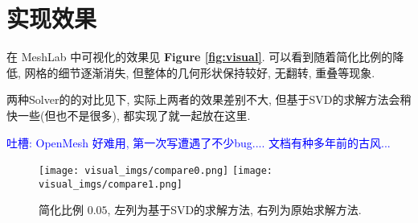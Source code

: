 \documentclass[11pt]{article}
\newcommand\1{\mathds{1}}
\begin{document}
\section{实现效果}
在 MeshLab 中可视化的效果见 \textbf{Figure \ref{fig:visual}}. 可以看到随着简化比例的降低,
网格的细节逐渐消失, 但整体的几何形状保持较好, 无翻转, 重叠等现象. 

两种Solver的的对比见下, 实际上两者的效果差别不大, 但基于SVD的求解方法会稍快一些(但也不是很多), 都实现了就一起放在这里.

\textcolor{blue}{吐槽: OpenMesh 好难用, 第一次写遭遇了不少bug.... 文档有种多年前的古风...}
\begin{figure}[htpb]
    \centering
    \texttt{[image: visual\_imgs/compare0.png]}
    \texttt{[image: visual\_imgs/compare1.png]}
    \caption{简化比例 $0.05$, 左列为基于SVD的求解方法, 右列为原始求解方法.}
    \label{fig:compare}
\end{figure}

\newpage
 
 
\end{document}
